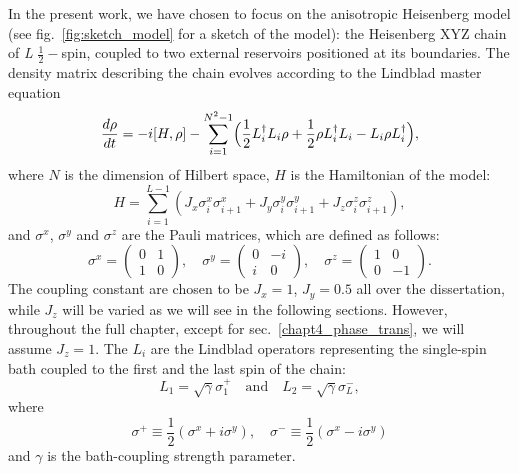 In the present work, we have chosen to focus on the anisotropic Heisenberg model (see fig.~\ref{fig:sketch_model} for a sketch of the model): the Heisenberg XYZ chain of \textit{L} $\frac{1}{2}-$spin, coupled to two external reservoirs positioned at its boundaries. The density matrix describing the chain evolves according to the Lindblad master equation
\begin{equation}
    \frac{d\rho}{dt} = -i[H, \rho] - \sum_{i=1}^{N^2-1}\Bigl(\frac{1}{2}L_i^{\dagger}L_i\rho + \frac{1}{2}\rho L_i^{\dagger}L_i - L_i\rho L_i^{\dagger}\Bigl),
\end{equation}
where $N$ is the dimension of Hilbert space, $H$ is the Hamiltonian of the model:
\begin{equation}
\label{ham_chain}
    H = \sum_{i = 1}^{L-1} (J_x \sigma_i^x \sigma_{i+1}^x + J_y \sigma_i^y \sigma_{i+1}^y + J_z \sigma_i^z \sigma_{i+1}^z),
\end{equation}
and $\sigma^x$, $\sigma^y$ and $\sigma^z$ are the Pauli matrices, which are defined as follows:
\begin{equation}
\sigma^x = 
    \begin{pmatrix}
        0 & 1 \\
        1 & 0
    \end{pmatrix}
    , \quad \sigma^y = 
    \begin{pmatrix}
        0 & -i \\
        i & 0
    \end{pmatrix}
    , \quad \sigma^z = 
    \begin{pmatrix}
        1 & 0 \\
        0 & -1
    \end{pmatrix}
    .
\end{equation}
The coupling constant are chosen to be $J_x = 1$, $J_y = 0.5$ all over the dissertation, while $J_z$ will be varied as we will see in the following sections. However, throughout the full chapter, except for sec.~\ref{chapt4_phase_trans}, we will assume $J_z=1$.
The $L_i$ are the Lindblad operators representing the single-spin bath coupled to the first and the last spin of the chain:
\begin{equation}
\label{dissipators}
    L_1 = \sqrt{\gamma} \sigma_1^+ \quad \text{and} \quad L_2 =\sqrt{\gamma}\sigma_L^-,
\end{equation}
where 
\begin{equation*}
    \sigma^+ \equiv \frac{1}{2}(\sigma^x + i\sigma^y), \quad \sigma^- \equiv \frac{1}{2}(\sigma^x - i\sigma^y)
\end{equation*}
and $\gamma$ is the bath-coupling strength parameter.

